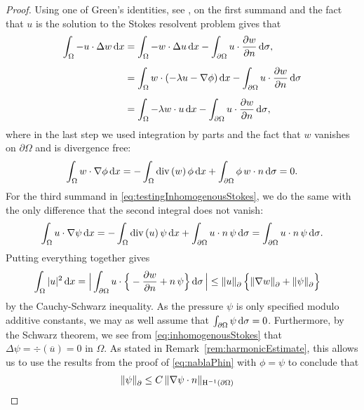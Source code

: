 \begin{proof}
  Using one of Green's identities, see \cite[Thm.\@~3, App.\@~C.2]{evans}, on the first summand and the fact that $u$ is the solution to the Stokes resolvent problem gives that
  \begin{align*}
    \int_\Omega -u \cdot \Delta w \, {\operatorname{d}\!{x}}
    &= \int_\Omega -w \cdot \Delta u \, {\operatorname{d}\!{x}} - \int_{\partial\Omega} u \cdot \frac{\partial w}{\partial n} \, {\operatorname{d}\!{\sigma}}, \\[0.5em]
    &= \int_\Omega w \cdot ( -\lambda u - \nabla \phi) \, {\operatorname{d}\!{x}} - \int_{\partial\Omega} u \cdot \frac{\partial w}{\partial n} \, {\operatorname{d}\!{\sigma}} \\[0.5em]
    &= \int_\Omega -\lambda w \cdot u \, {\operatorname{d}\!{x}} - \int_{\partial\Omega} u \cdot \frac{\partial w}{\partial n} \, {\operatorname{d}\!{\sigma}}, 
  \end{align*}
  where in the last step we used integration by parts and the fact that $w$ vanishes on $\partial\Omega$ and is divergence free:
  \begin{align*}
    \int_\Omega w \cdot \nabla\phi \, {\operatorname{d}\!{x}} = -\int_\Omega \mathrm{div\,} (w) \, \phi \, {\operatorname{d}\!{x}} + \int_{\partial\Omega} \phi \, w \cdot n \, {\operatorname{d}\!{\sigma}} = 0.
  \end{align*}
  For the third summand in \eqref{eq:testingInhomogenousStokes}, we do the same with the only difference that the second integral does not vanish:
  \begin{align*}
    \int_\Omega u \cdot \nabla\psi \, {\operatorname{d}\!{x}} 
    = -\int_\Omega \mathrm{div\,} (u)\, \psi \, {\operatorname{d}\!{x}} + \int_{\partial\Omega} u \cdot n\, \psi \, {\operatorname{d}\!{\sigma}} 
    = \int_{\partial\Omega} u \cdot n  \,\psi \, {\operatorname{d}\!{\sigma}}.
  \end{align*}
  Putting everything together gives
  \begin{align}
    \int_\Omega |u|^2 \, {\operatorname{d}\!{x}} 
    &= \Big| \int_{\partial\Omega} u \cdot \Big\{ - \frac{\partial w}{\partial n} + n\, \psi \Big\} \, {\operatorname{d}\!{\sigma}}\, \Big|
    \leq \| u\|^{}_\partial \, \Big\{ \|\nabla w\|^{}_\partial + \|\psi\|^{}_\partial \Big\} \label{eq:u2estimate}
  \end{align}
  by the Cauchy-Schwarz inequality.
  As the pressure $\psi$ is only specified modulo additive constants, we may as well assume that $\int_{\partial\Omega} \psi \, {\operatorname{d}\!{\sigma}} = 0$.
  Furthermore, by the Schwarz theorem, we see from \eqref{eq:inhomogenousStokes} that $\Delta \psi = \div(\overline u) = 0$ in $\Omega$. 
  As stated in Remark~\ref{rem:harmonicEstimate}, this allows us to use the results from the proof of \eqref{eq:nablaPhin} with $\phi = \psi$ to conclude that
  \begin{align}
      \|\psi\|^{}_\partial 
    &\leq C\, \| \nabla \psi \cdot n\|_{\HH^{-1}(\partial\Omega)} \nonumber

\end{align}
\end{proof}
